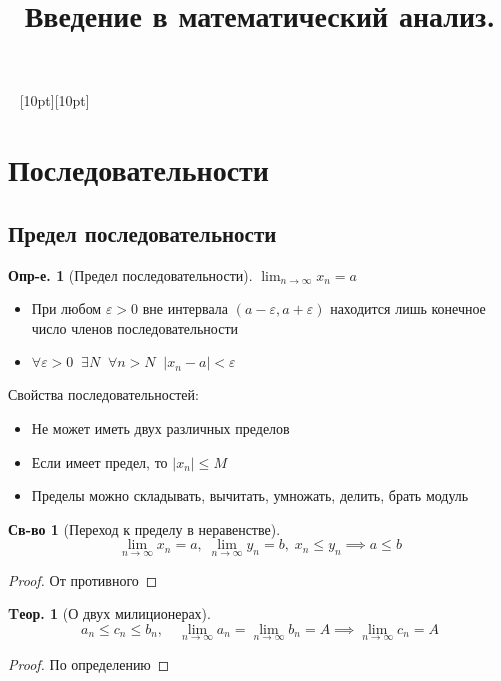 \documentclass[a4paper,12pt]{article}
\title{Введение в математический анализ.}
\author{}
\date{}
\numberwithin{figure}{section}
\theoremstyle{definition}
\newtheorem{definition}{Опр-е.}[section]
\newtheorem*{property}{Св-во}   %
\newtheorem{theorem}{Tеор.}[section]
\def\DS{\displaystyle}
\def\.{\;\;}
\def\eps{\varepsilon}
\def\ntoinf{n\to\infty}
\def\leqs{\leqslant}
\def\vignette{\vspace{48pt} \noindent \hrulefill~ \raisebox{-8pt}[10pt][10pt]{\Huge\ding{102}}~ \hrulefill}
\begin{document}
\maketitle
\tableofcontents


\vignette
\section{Последовательности}

\subsection{Предел последовательности}

\begin{definition}[Предел последовательности]
	$\DS \lim_{\ntoinf} x_n = a $
	\begin{itemize}
		\item При любом $\eps>0$ вне интервала $(a-\eps,a+\eps)$
			  находится лишь конечное число членов последовательности
		\item $\forall \eps>0 \. \exists N \. \forall n>N \. |x_n - a|<\eps$
	\end{itemize}
\end{definition}

\medskip
Свойства последовательностей:
\begin{itemize}
	\item Не может иметь двух различных пределов
	\item Если имеет предел, то $|x_n| \leqs M$
	\item Пределы можно складывать, вычитать, умножать, делить, брать модуль
\end{itemize}


\begin{property}[Переход к пределу в неравенстве]
\[ \lim_{\ntoinf}x_n=a ,\; \lim_{\ntoinf}y_n=b ,\; x_n \leqs y_n
   \implies a \leqs b \]
\end{property}
\begin{proof} От противного \end{proof}


\begin{theorem}[О двух милиционерах]
	\[ a_n \leqs c_n \leqs b_n , \quad
	   \lim_{\ntoinf}a_n = \lim_{\ntoinf}b_n = A
	   \implies \lim_{\ntoinf}c_n = A \]
\end{theorem}
\begin{proof} По определению \end{proof}
\end{document}

